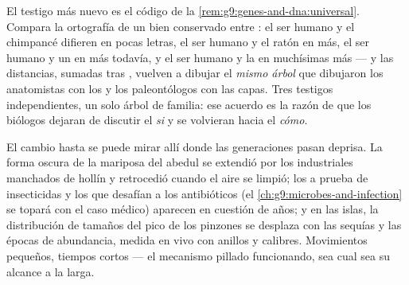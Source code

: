 \begin{proposition}\label{prop:g9:evidence-of-evolution:molecules}
El testigo más nuevo es el código de la
\cref{rem:g9:genes-and-dna:universal}. Compara la ortografía de un 
bien conservado entre : el ser humano y el chimpancé difieren
en pocas letras, el ser humano y el ratón en más, el ser humano y un
 en más todavía, y el ser humano y la  en muchísimas más ---
y las distancias, sumadas  tras , vuelven a dibujar el
\emph{mismo árbol} que dibujaron los anatomistas con los  y los
paleontólogos con las capas. Tres testigos independientes, un solo
árbol de familia: ese acuerdo es la razón de que los biólogos dejaran
de discutir el \emph{si} y se volvieran hacia el \emph{cómo}.
\end{proposition}
\admitted

\begin{example}\label{ex:g9:evidence-of-evolution:live}
El cambio hasta se puede mirar allí donde las generaciones pasan
deprisa. La forma oscura de la mariposa del abedul se extendió por los
 industriales manchados de hollín y retrocedió cuando el aire se
limpió; los  a prueba de insecticidas y los  que
desafían a los antibióticos (el
\cref{ch:g9:microbes-and-infection} se topará con el caso médico)
aparecen en cuestión de años; y en las islas, la distribución de
tamaños del pico de los pinzones se desplaza con las sequías y las
épocas de abundancia, medida en vivo con anillos y calibres.
Movimientos pequeños, tiempos cortos --- el mecanismo pillado
funcionando, sea cual sea su alcance a la larga.
\end{example}

